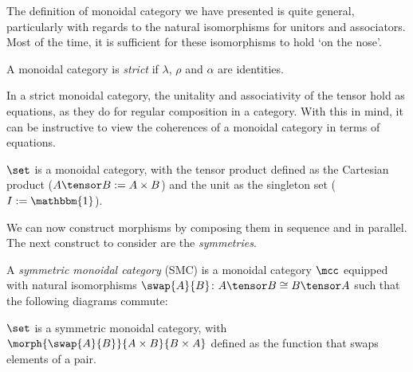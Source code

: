 The definition of monoidal category we have presented is quite general,
particularly with regards to the natural isomorphisms for unitors and
associators.
Most of the time, it is sufficient for these isomorphisms to hold `on the nose'.

\begin{definition}
    A monoidal category is \emph{strict} if \(\lambda\), \(\rho\) and \(\alpha\)
    are identities.
\end{definition}

In a strict monoidal category, the unitality and associativity of the tensor
hold as equations, as they do for regular composition in a category.
With this in mind, it can be instructive to view the coherences of a monoidal
category in terms of equations.



\begin{example}
    \(\set\) is a monoidal category, with the tensor product defined as the
    Cartesian product (\(A \tensor B := A \times B\)) and the unit as the
    singleton set (\(I := \mathbbm{1}\)).
\end{example}


We can now construct morphisms by composing them in sequence and in parallel.
The next construct to consider are the \emph{symmetries}.

\begin{definition}
    \label{def:symmetric-monoidal-category}
    A \emph{symmetric monoidal category} (SMC) is a monoidal category \(\mcc\)
    equipped with natural isomorphisms \(
        \swap{A}{B} \colon A \tensor B \cong B \tensor A
    \) such that the following diagrams commute:
    \begin{center}
        
        

        \vspace{1em}

        
    \end{center}
\end{definition}

\begin{example}
    \(\set\) is a symmetric monoidal category, with \(
        \morph{\swap{A}{B}}{A \times B}{B \times A}
    \) defined as the function that swaps elements of a pair.
\end{example}

